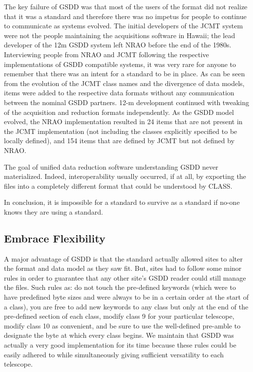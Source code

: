 \documentclass[final,authoryear,5p,times,twocolumn]{elsarticle}
\begin{document}
The key failure of GSDD was that most of the users of the format did
not realize that it was a standard and therefore there was no
impetus for people to continue to communicate as systems
evolved. The initial developers of the JCMT system were not the people
maintaining the acquisitions software in Hawaii; the lead developer of
the 12m GSDD system left NRAO before the end of the 1980s.
Interviewing people from NRAO and JCMT following the
respective implementations of GSDD compatible systems, it was very rare
for anyone to remember that there was an intent for a standard to be
in place. As can be seen from the evolution of the JCMT class names
and the divergence of data models, items were added to the respective
data formats without any communication between the nominal GSDD
partners. 12-m development continued with tweaking of the acquisition
and reduction formats independently.  As the GSDD model evolved, the
NRAO implementation resulted in 24 items that are not present in the
JCMT implementation (not including the classes explicitly specified to
be locally defined), and 154 items that are defined by JCMT but not
defined by NRAO.

The goal of unified data reduction software understanding GSDD never
materialized. Indeed, interoperability usually occurred, if at all, by exporting
the files into a completely different format that could be understood
by CLASS.

In conclusion, it is impossible for a standard to survive as a standard
if no-one knows they are using a standard.

\subsection{Embrace Flexibility}

A major advantage of GSDD is that the standard actually allowed sites
to alter the format and data model as they saw fit.  But, sites had to
follow some minor rules in order to guarantee that any other site's
GSDD reader could still manage the files.  Such rules as: do not touch
the pre-defined keywords (which were to have predefined byte sizes and
were always to be in a certain order at the start of a class), you are
free to add new keywords to any class but only at the end of the
pre-defined section of each class, modify class 9 for your particular
telescope, modify class 10 as convenient, and be sure to
use the well-defined pre-amble to designate the byte at which every
class begins.  We maintain that GSDD was actually a very good
implementation for its time because these rules could be easily
adhered to while simultaneously giving sufficient versatility to each
telescope.
\end{document}
